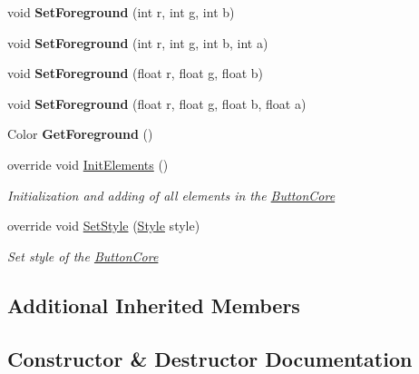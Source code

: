 \begin{DoxyCompactItemize}
void {\bfseries Set\+Foreground} (int r, int g, int b)
\item 
\mbox{\label{class_space_v_i_l_1_1_button_core_a730c0574ca870dd768c4baa9504f014d}} 
void {\bfseries Set\+Foreground} (int r, int g, int b, int a)
\item 
\mbox{\label{class_space_v_i_l_1_1_button_core_a44e45145dd36a2cbee376d3efb5eb22c}} 
void {\bfseries Set\+Foreground} (float r, float g, float b)
\item 
\mbox{\label{class_space_v_i_l_1_1_button_core_adc86dbdc35f4fefc84b2598d7fa4f1af}} 
void {\bfseries Set\+Foreground} (float r, float g, float b, float a)
\item 
\mbox{\label{class_space_v_i_l_1_1_button_core_a73cabca45794e5e8bcc5797ea26c71cb}} 
Color {\bfseries Get\+Foreground} ()
\item 
override void \mbox{\hyperlink{class_space_v_i_l_1_1_button_core_a4321848c2398d6e08da3bfea649e3e31}{Init\+Elements}} ()
\begin{DoxyCompactList}\small\item\em Initialization and adding of all elements in the \mbox{\hyperlink{class_space_v_i_l_1_1_button_core}{Button\+Core}} \end{DoxyCompactList}\item 
override void \mbox{\hyperlink{class_space_v_i_l_1_1_button_core_adf846a4e98ee6bbf8722232f10622231}{Set\+Style}} (\mbox{\hyperlink{class_space_v_i_l_1_1_decorations_1_1_style}{Style}} style)
\begin{DoxyCompactList}\small\item\em Set style of the \mbox{\hyperlink{class_space_v_i_l_1_1_button_core}{Button\+Core}} \end{DoxyCompactList}\end{DoxyCompactItemize}
\subsection*{Additional Inherited Members}


\subsection{Constructor \& Destructor Documentation}
\mbox{\label{class_space_v_i_l_1_1_button_core_ab1139f0c4796d74ef4444f79626d751c}} 
